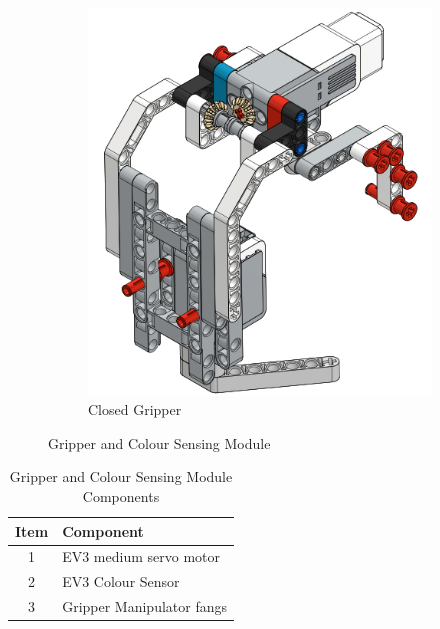 \begin{figure}[!ht]
\begin{subfigure}[b]{0.45\textwidth}
		\includegraphics[width=\textwidth]{Graphics/ClosedGripper}
		\caption{Closed Gripper}
		\label{fig:ClosedGripper}
	\end{subfigure}
	\caption{Gripper and Colour Sensing Module}
	\label{fig:gripper}
\end{figure}

\begin{table}[!ht]
	\centering
	\caption{Gripper and Colour Sensing Module Components}
	\vspace{-2mm}
	\label{tab:ColourSensingComponents}
	\begin{tabular}{cl}
		\hline
		\textbf{Item}&\textbf{Component}\\
		\hline
		1&EV3 medium servo motor\\
		2&EV3 Colour Sensor\\
		3&Gripper Manipulator fangs\\
		\hline			
	\end{tabular}
\end{table}


